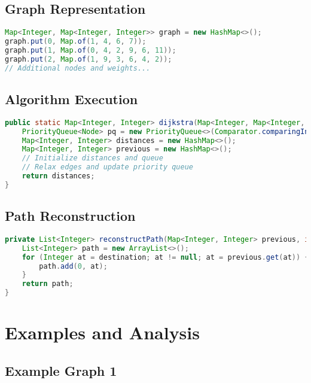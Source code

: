 \documentclass{article}
\begin{document}
\subsection{Graph Representation}

\begin{lstlisting}[language=Java, caption=Graph Representation in Java]
Map<Integer, Map<Integer, Integer>> graph = new HashMap<>();
graph.put(0, Map.of(1, 4, 6, 7));
graph.put(1, Map.of(0, 4, 2, 9, 6, 11));
graph.put(2, Map.of(1, 9, 3, 6, 4, 2));
// Additional nodes and weights...
\end{lstlisting}

\subsection{Algorithm Execution}

\begin{lstlisting}[language=Java, caption=Dijkstra's Algorithm Implementation]
public static Map<Integer, Integer> dijkstra(Map<Integer, Map<Integer, Integer>> graph, int start) {
    PriorityQueue<Node> pq = new PriorityQueue<>(Comparator.comparingInt(n -> n.weight));
    Map<Integer, Integer> distances = new HashMap<>();
    Map<Integer, Integer> previous = new HashMap<>();
    // Initialize distances and queue
    // Relax edges and update priority queue
    return distances;
}
\end{lstlisting}

\subsection{Path Reconstruction}

\begin{lstlisting}[language=Java, caption=Path Reconstruction Method]
private List<Integer> reconstructPath(Map<Integer, Integer> previous, int destination) {
    List<Integer> path = new ArrayList<>();
    for (Integer at = destination; at != null; at = previous.get(at)) {
        path.add(0, at);
    }
    return path;
}
\end{lstlisting}

\section{Examples and Analysis}

\subsection{Example Graph 1}
\end{document}
